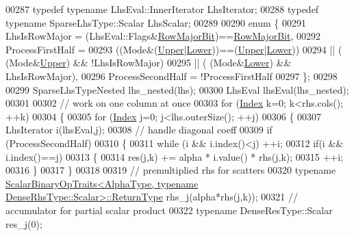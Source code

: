 \begin{DoxyCode}
00287   \textcolor{keyword}{typedef} \textcolor{keyword}{typename} LhsEval::InnerIterator LhsIterator;
00288   \textcolor{keyword}{typedef} \textcolor{keyword}{typename} SparseLhsType::Scalar LhsScalar;
00289   
00290   \textcolor{keyword}{enum} \{
00291     LhsIsRowMajor = (LhsEval::Flags&\hyperlink{group__flags_gae4f56c2a60bbe4bd2e44c5b19cbe8762}{RowMajorBit})==\hyperlink{group__flags_gae4f56c2a60bbe4bd2e44c5b19cbe8762}{RowMajorBit},
00292     ProcessFirstHalf =
00293               ((Mode&(\hyperlink{group__enums_gga39e3366ff5554d731e7dc8bb642f83cda6bcb58be3b8b8ec84859ce0c5ac0aaec}{Upper}|\hyperlink{group__enums_gga39e3366ff5554d731e7dc8bb642f83cda891792b8ed394f7607ab16dd716f60e6}{Lower}))==(\hyperlink{group__enums_gga39e3366ff5554d731e7dc8bb642f83cda6bcb58be3b8b8ec84859ce0c5ac0aaec}{Upper}|\hyperlink{group__enums_gga39e3366ff5554d731e7dc8bb642f83cda891792b8ed394f7607ab16dd716f60e6}{Lower}))
00294           || ( (Mode&\hyperlink{group__enums_gga39e3366ff5554d731e7dc8bb642f83cda6bcb58be3b8b8ec84859ce0c5ac0aaec}{Upper}) && !LhsIsRowMajor)
00295           || ( (Mode&\hyperlink{group__enums_gga39e3366ff5554d731e7dc8bb642f83cda891792b8ed394f7607ab16dd716f60e6}{Lower}) && LhsIsRowMajor),
00296     ProcessSecondHalf = !ProcessFirstHalf
00297   \};
00298   
00299   SparseLhsTypeNested lhs\_nested(lhs);
00300   LhsEval lhsEval(lhs\_nested);
00301 
00302   \textcolor{comment}{// work on one column at once}
00303   \textcolor{keywordflow}{for} (\hyperlink{group___core___module_a554f30542cc2316add4b1ea0a492ff02}{Index} k=0; k<rhs.cols(); ++k)
00304   \{
00305     \textcolor{keywordflow}{for} (\hyperlink{group___core___module_a554f30542cc2316add4b1ea0a492ff02}{Index} j=0; j<lhs.outerSize(); ++j)
00306     \{
00307       LhsIterator i(lhsEval,j);
00308       \textcolor{comment}{// handle diagonal coeff}
00309       \textcolor{keywordflow}{if} (ProcessSecondHalf)
00310       \{
00311         \textcolor{keywordflow}{while} (i && i.index()<j) ++i;
00312         \textcolor{keywordflow}{if}(i && i.index()==j)
00313         \{
00314           res(j,k) += alpha * i.value() * rhs(j,k);
00315           ++i;
00316         \}
00317       \}
00318 
00319       \textcolor{comment}{// premultiplied rhs for scatters}
00320       \textcolor{keyword}{typename} 
      \hyperlink{group___core___module_struct_eigen_1_1_scalar_binary_op_traits}{ScalarBinaryOpTraits<AlphaType, typename DenseRhsType::Scalar>::ReturnType}
       rhs\_j(alpha*rhs(j,k));
00321       \textcolor{comment}{// accumulator for partial scalar product}
00322       \textcolor{keyword}{typename} DenseResType::Scalar res\_j(0);

\end{DoxyCode}
